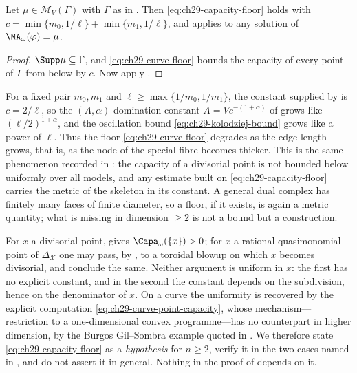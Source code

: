 \begin{corollary}
\label{cor:ch29-curve-floor}
Let \(\mu\in\mathcal M_V(\Gamma)\) with \(\Gamma\) as in
.  Then
\eqref{eq:ch29-capacity-floor} holds with
\(c=\min\{m_0,1/\ell\}+\min\{m_1,1/\ell\}\), and
 applies to any solution of
\(\MA_\omega(\varphi)=\mu\).
\end{corollary}

\begin{proof}
\(\Supp\mu\subseteq\Gamma\), and \eqref{eq:ch29-curve-floor} bounds the
capacity of every point of \(\Gamma\) from below by \(c\).  Now apply
.
\end{proof}

\begin{remark}
\label{rem:ch29-floor-metric}
For a fixed pair \(m_0,m_1\) and \(\ell\geq\max\{1/m_0,1/m_1\}\), the
constant supplied by  is \(c=2/\ell\), so the
\((A,\alpha)\)-domination constant \(A=Vc^{-(1+\alpha)}\) of
 grows like \((\ell/2)^{1+\alpha}\), and the
oscillation bound \eqref{eq:ch29-kolodziej-bound} grows like a power of
\(\ell\).  Thus the floor \eqref{eq:ch29-curve-floor} degrades as the edge
length grows, that is, as the node of the special fibre becomes thicker.
This is the same phenomenon recorded in
: the capacity of a divisorial point is not
bounded below uniformly over all models, and any estimate built on
\eqref{eq:ch29-capacity-floor} carries the metric of the skeleton in its
constant.  A general dual complex has finitely many faces of finite
diameter, so a floor, if it exists, is again a metric quantity; what is
missing in dimension \(\geq2\) is not a bound but a construction.
\end{remark}

\begin{remark}
\label{rem:ch29-floor-open}
For \(x\) a divisorial point,  gives
\(\Capa_\omega(\{x\})>0\); for \(x\) a rational quasimonomial point of
\(\Delta_{\mathcal X}\) one may pass, by
, to a toroidal blowup on which \(x\) becomes
divisorial, and conclude the same.  Neither argument is uniform in \(x\):
the first has no explicit constant, and in the second the constant depends
on the subdivision, hence on the denominator of \(x\).  On a curve the
uniformity is recovered by the explicit computation
\eqref{eq:ch29-curve-point-capacity}, whose mechanism---restriction to a
one-dimensional convex programme---has no counterpart in higher dimension,
by the Burgos Gil--Sombra example quoted in
.  We therefore state
\eqref{eq:ch29-capacity-floor} as a \emph{hypothesis} for \(n\geq2\), verify
it in the two cases named in , and do not
assert it in general.  Nothing in the proof of
 depends on it.
\end{remark}

